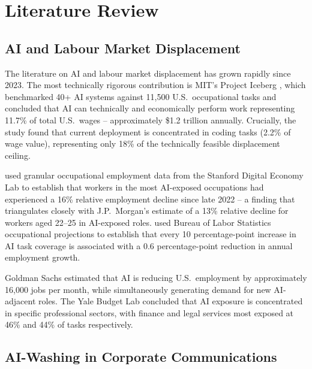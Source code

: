 \documentclass[12pt, a4paper]{article}
\begin{document}
\section{Literature Review}

\subsection{AI and Labour Market Displacement}

The literature on AI and labour market displacement has grown rapidly since 2023. The most
technically rigorous contribution is MIT's Project Iceberg \citep{mit2025}, which benchmarked
40+ AI systems against 11,500 U.S.\ occupational tasks and concluded that AI can technically
and economically perform work representing 11.7\% of total U.S.\ wages -- approximately
\$1.2 trillion annually. Crucially, the study found that current deployment is concentrated
in coding tasks (2.2\% of wage value), representing only 18\% of the technically feasible
displacement ceiling.

\citet{brynjolfsson2025} used granular occupational employment data from the Stanford Digital
Economy Lab to establish that workers in the most AI-exposed occupations had experienced a
16\% relative employment decline since late 2022 -- a finding that triangulates closely with
J.P.~Morgan's \citeyearpar{jpmorgan2025} estimate of a 13\% relative decline for workers
aged 22--25 in AI-exposed roles. \citet{anthropic2026} used Bureau of Labor Statistics
occupational projections to establish that every 10 percentage-point increase in AI task
coverage is associated with a 0.6 percentage-point reduction in annual employment growth.

Goldman Sachs \citeyearpar{goldmansachs2025} estimated that AI is reducing U.S.\ employment
by approximately 16,000 jobs per month, while simultaneously generating demand for new
AI-adjacent roles. The Yale Budget Lab \citeyearpar{yalebudgetlab2025} concluded that AI
exposure is concentrated in specific professional sectors, with finance and legal services
most exposed at 46\% and 44\% of tasks respectively.

\subsection{AI-Washing in Corporate Communications}
\end{document}
